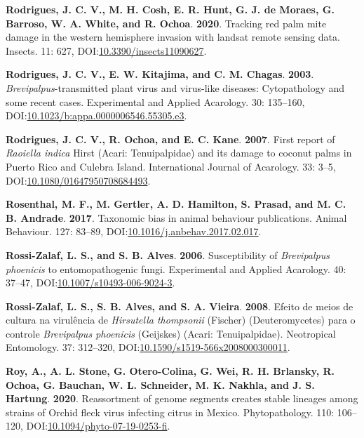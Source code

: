 \documentclass[12pt,final,CPage]{ufthesis}
\newlength{\cslhangindent}
\newenvironment{CSLReferences}[2] %
{%
	\setlength{\parindent}{0pt}
	\ifodd #1 \everypar{\setlength{\hangindent}{\cslhangindent}}\ignorespaces\fi
	\ifnum #2 > 0
	\setlength{\parskip}{#2\baselineskip}
	\fi
}%
{}
\begin{document}
{\begin{CSLReferences}{1}{0}
  \leavevmode{}%
  \textbf{Rodrigues, J. C. V., M. H. Cosh, E. R. Hunt, G. J. de Moraes, G. Barroso, W. A. White, and R. Ochoa}. \textbf{2020}. Tracking red palm mite damage in the western hemisphere invasion with landsat remote sensing data. Insects. 11: 627, DOI:\href{https://doi.org/10.3390/insects11090627}{10.3390/insects11090627}.

  \leavevmode{}%
  \textbf{Rodrigues, J. C. V., E. W. Kitajima, and C. M. Chagas}. \textbf{2003}. {\emph{Brevipalpus}}-transmitted plant virus and virus-like diseases: Cytopathology and some recent cases. Experimental and Applied Acarology. 30: 135--160, DOI:\href{https://doi.org/10.1023/b:appa.0000006546.55305.e3}{10.1023/b:appa.0000006546.55305.e3}.

  \leavevmode{}%
  \textbf{Rodrigues, J. C. V., R. Ochoa, and E. C. Kane}. \textbf{2007}. First report of {\emph{Raoiella indica}} {Hirst} ({Acari}: {Tenuipalpidae}) and its damage to coconut palms in {Puerto Rico} and {Culebra Island}. International Journal of Acarology. 33: 3--5, DOI:\href{https://doi.org/10.1080/01647950708684493}{10.1080/01647950708684493}.

  \leavevmode{}%
  \textbf{Rosenthal, M. F., M. Gertler, A. D. Hamilton, S. Prasad, and M. C. B. Andrade}. \textbf{2017}. Taxonomic bias in animal behaviour publications. Animal Behaviour. 127: 83--89, DOI:\href{https://doi.org/10.1016/j.anbehav.2017.02.017}{10.1016/j.anbehav.2017.02.017}.

  \leavevmode{}%
  \textbf{Rossi-Zalaf, L. S., and S. B. Alves}. \textbf{2006}. Susceptibility of {\emph{Brevipalpus phoenicis}} to entomopathogenic fungi. Experimental and Applied Acarology. 40: 37--47, DOI:\href{https://doi.org/10.1007/s10493-006-9024-3}{10.1007/s10493-006-9024-3}.

  \leavevmode{}%
  \textbf{Rossi-Zalaf, L. S., S. B. Alves, and S. A. Vieira}. \textbf{2008}. Efeito de meios de cultura na virul{ê}ncia de {\emph{Hirsutella thompsonii}} ({Fischer}) ({Deuteromycetes}) para o controle {\emph{Brevipalpus phoenicis}} ({Geijskes}) ({Acari}: {Tenuipalpidae}). Neotropical Entomology. 37: 312--320, DOI:\href{https://doi.org/10.1590/s1519-566x2008000300011}{10.1590/s1519-566x2008000300011}.

  \leavevmode{}%
  \textbf{Roy, A., A. L. Stone, G. Otero-Colina, G. Wei, R. H. Brlansky, R. Ochoa, G. Bauchan, W. L. Schneider, M. K. Nakhla, and J. S. Hartung}. \textbf{2020}. Reassortment of genome segments creates stable lineages among strains of {Orchid fleck virus} infecting citrus in {Mexico}. Phytopathology{\textregistered}. 110: 106--120, DOI:\href{https://doi.org/10.1094/phyto-07-19-0253-fi}{10.1094/phyto-07-19-0253-fi}.


\end{CSLReferences}}
\end{document}
